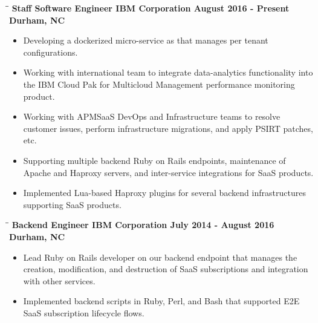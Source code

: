\documentclass[8pt]{res}
\begin{document}
\begin{resume}
    \begin{tabbing}
      \hspace{2.3in}\= \hspace{2.6in}\= \kill %
      \bf Staff Software Engineer \>\bf IBM Corporation \>\bf August 2016 - Present\\ \>\bf Durham, NC
    \end{tabbing}\vspace{-10pt}      %
    \begin{itemize}
      \item Developing a dockerized micro-service as that manages per tenant configurations.
      \item Working with international team to integrate data-analytics functionality into the IBM Cloud Pak for Multicloud Management performance monitoring product. 
      \item Working with APMSaaS DevOps and Infrastructure teams to resolve customer issues, perform infrastructure migrations, and apply PSIRT patches, etc.
      \item Supporting multiple backend Ruby on Rails endpoints, maintenance of Apache and Haproxy servers, and inter-service integrations for SaaS products.
      \item Implemented Lua-based Haproxy plugins for several backend infrastructures supporting SaaS products.
    \end{itemize}\vspace{-18pt}      %
    \begin{tabbing}
      \hspace{2.3in}\= \hspace{2.6in}\= \kill %
      \bf Backend Engineer \>\bf IBM Corporation \>\bf July 2014 - August 2016\\ \>\bf Durham, NC
    \end{tabbing}\vspace{-10pt}      %
    \begin{itemize}
      \item Lead Ruby on Rails developer on our backend endpoint that manages the creation, modification, and destruction of SaaS subscriptions and integration with other services.
      \item Implemented backend scripts in Ruby, Perl, and Bash that supported E2E SaaS subscription lifecycle flows.

\end{itemize}
\end{resume}
\end{document}
